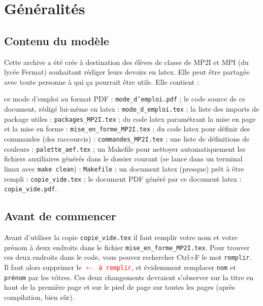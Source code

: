 \documentclass[12pt,a4paper,fleqn]{article}
\begin{document}
\pagestyle{fancy} %

\section{Généralités}
\subsection{Contenu du modèle}
Cette archive a été crée à destination des élèves de classe de MP2I et MPI
(du lycée Fermat) souhaitant rédiger leurs devoirs en latex.
Elle peut être partagée avec toute personne à qui ça pourrait être utile.
Elle contient :
\begin{itemize}
  \flch ce mode d'emploi au format PDF : \texttt{mode\_d'emploi.pdf} ;
  \flch le code source de ce document, rédigé lui-même en latex : \texttt{mode\_d\_emploi.tex} ;
  \flch la liste des imports de package utiles : \texttt{packages\_MP2I.tex} ;
  \flch du code latex paramétrant la mise en page et la mise en forme : \texttt{mise\_en\_forme\_MP2I.tex} ;
  \flch du code latex pour définir des commandes (des raccourcis) : \texttt{commandes\_MP2I.tex} ;
  \flch une liste de définitions de couleurs : \texttt{palette\_aef.tex} ;
  \flch un Makefile pour nettoyer automatiquement les fichiers auxiliaires générés dans le dossier courant (se lance dans un terminal linux avec \texttt{make clean}) : \texttt{Makefile} ;
  \flch un document latex (presque) prêt à être rempli : \texttt{copie\_vide.tex} ;
  \flch le document PDF généré par ce document latex : \texttt{copie\_vide.pdf}.
\end{itemize}


\subsection{Avant de commencer}
Avant d'utiliser la copie \texttt{copie\_vide.tex}
il faut remplir votre nom et votre prénom à deux endroits dans
le fichier \texttt{mise\_en\_forme\_MP2I.tex}.
Pour trouver ces deux endroits dans le code,
vous pouvez rechercher \textsf{Ctrl+F} le mot \texttt{remplir}.\\
Il faut alors supprimer le  
\texttt{\textcolor{red}{$\leftarrow$ à remplir}},
et évidemment remplacer \texttt{nom} et \texttt{prénom} par les vôtres.
Ces deux changements devraient s'observer sur la titre en haut de la première page
et sur le pied de page sur toutes les pages (après compilation, bien sûr).
\end{document}
